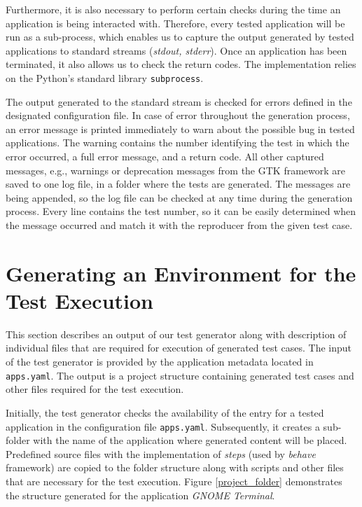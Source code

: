 Furthermore, it is also necessary to perform certain checks during the time an application is being interacted with. Therefore, every tested application will be run as a sub-process, which enables us to capture the output generated by tested applications to standard streams (\textit{stdout, stderr}). Once an application has been terminated, it also allows us to check the return codes. The implementation relies on the Python's standard library \texttt{subprocess}. 

The output generated to the standard stream is checked for errors defined in the designated configuration file. In case of error throughout the generation process, an error message is printed immediately to warn about the possible bug in tested applications. The warning contains the number identifying the test in which the error occurred, a full error message, and a return code. All other captured messages, e.g., warnings or deprecation messages from the GTK framework are saved to one log file, in a folder where the tests are generated. The messages are being appended, so the log file can be checked at any time during the generation process. Every line contains the test number, so it can be easily determined when the message occurred and match it with the reproducer from the given test case.



\section{Generating an Environment for the Test Execution}\label{generator_output}
This section describes an output of our test generator along with description of individual files that are required for execution of generated test cases. The input of the test generator is provided by the application metadata located in \texttt{apps.yaml}. The output is a project structure containing generated test cases and other files required for the test execution. 

Initially, the test generator checks the availability of the entry for a tested application in the configuration file \texttt{apps.yaml}. Subsequently, it creates a sub-folder with the name of the application where generated content will be placed. Predefined source files with the implementation of \textit{steps} (used by \textit{behave} framework) are copied to the folder structure along with scripts and other files that are necessary for the test execution. Figure \ref{project_folder} demonstrates the structure generated for the application \textit{GNOME Terminal}.

